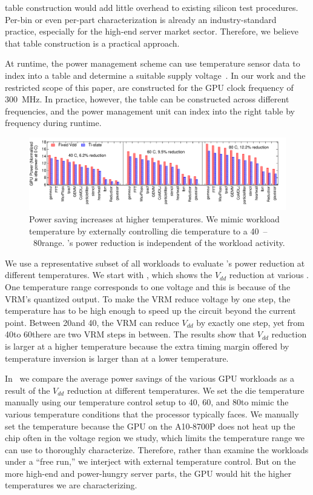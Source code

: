 \tistate table construction would add little overhead to existing silicon test procedures. Per-bin or even per-part characterization is already an industry-standard practice, especially for the high-end server market sector. Therefore, we believe that \tistate table construction is a practical approach.

At runtime, the power management scheme can use temperature sensor data to index into a \tistate table and determine a suitable supply voltage~\cite{sriram2016avfs}. In our work and the restricted scope of this paper, \tistates are constructed for the GPU clock frequency of 300~MHz. In practice, however, the \tistate table can be constructed across different frequencies, and the power management unit can index into the right table by frequency during runtime. 

\begin{figure}[t!]
  \centering
  \includegraphics[trim=0 0 0 0,clip,width=0.95\linewidth]{graphs/temperature/evaluate-tistate.pdf}
  \caption{Power saving increases at higher temperatures. We mimic workload temperature by externally controlling die temperature to a 40\C~--~80\C range. \tistate's power reduction is independent of the workload activity. }
  \label{fig:power-save-orig}
\end{figure}

We use a representative subset of all workloads to evaluate \tistate's power reduction at different temperatures. We start with , which shows the $V_{dd}$ reduction at various \tistates. One temperature range corresponds to one voltage and this is because of the VRM's quantized output. To make the VRM reduce voltage by one step, the temperature has to be high enough to speed up the circuit beyond the current point. Between 20\C and 40\C, the VRM can reduce $V_{dd}$ by exactly one step, yet from 40\C to 60\C there are two VRM steps in between. The results show that $V_{dd}$ reduction is larger at a higher temperature because the extra timing margin offered by temperature inversion is larger than at a lower temperature. 

In~ we compare the average power savings of the various GPU workloads as a result of the $V_{dd}$ reduction at different temperatures. We set the die temperature manually using our temperature control setup to 40\C, 60\C, and 80\C to mimic the various temperature conditions that the processor typically faces. We manually set the temperature because the GPU on the A10-8700P does not heat up the chip often in the voltage region we study, which limits the temperature range we can use to thoroughly characterize. Therefore, rather than examine the workloads under a ``free run,'' we interject with external temperature control. But on the more high-end and power-hungry server parts, the GPU would hit the higher temperatures we are characterizing.

